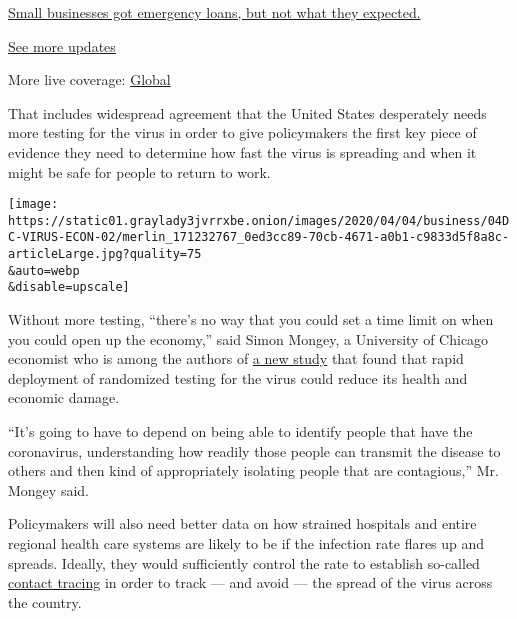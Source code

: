 \href{https://www.nytimes3xbfgragh.onion/live/2020/08/03/business/stock-market-today-coronavirus?action=click\&pgtype=Article\&state=default\&region=MAIN_CONTENT_1\&context=storylines_live_updates\#small-businesses-got-emergency-loans-but-not-what-they-expected}{Small
businesses got emergency loans, but not what they expected.}

\href{https://www.nytimes3xbfgragh.onion/live/2020/08/03/business/stock-market-today-coronavirus?action=click\&pgtype=Article\&state=default\&region=MAIN_CONTENT_1\&context=storylines_live_updates}{See
more updates}

More live coverage:
\href{https://www.nytimes3xbfgragh.onion/2020/08/04/world/coronavirus-covid-19.html?action=click\&pgtype=Article\&state=default\&region=MAIN_CONTENT_1\&context=storylines_live_updates}{Global}

That includes widespread agreement that the United States desperately
needs more testing for the virus in order to give policymakers the first
key piece of evidence they need to determine how fast the virus is
spreading and when it might be safe for people to return to work.

\texttt{[image: https://static01.graylady3jvrrxbe.onion/images/2020/04/04/business/04DC-VIRUS-ECON-02/merlin\_171232767\_0ed3cc89-70cb-4671-a0b1-c9833d5f8a8c-articleLarge.jpg?quality=75\\\&auto=webp\\\&disable=upscale]}

Without more testing, ``there's no way that you could set a time limit
on when you could open up the economy,'' said Simon Mongey, a University
of Chicago economist who is among the authors of
\href{https://bfi.uchicago.edu/working-paper/working-paper-2020-25/}{a
new study} that found that rapid deployment of randomized testing for
the virus could reduce its health and economic damage.

``It's going to have to depend on being able to identify people that
have the coronavirus, understanding how readily those people can
transmit the disease to others and then kind of appropriately isolating
people that are contagious,'' Mr. Mongey said.

Policymakers will also need better data on how strained hospitals and
entire regional health care systems are likely to be if the infection
rate flares up and spreads. Ideally, they would sufficiently control the
rate to establish so-called
\href{https://www.nytimes3xbfgragh.onion/2020/03/30/us/politics/trump-governors-coronavirus-testing.html}{contact
tracing} in order to track --- and avoid --- the spread of the virus
across the country.

